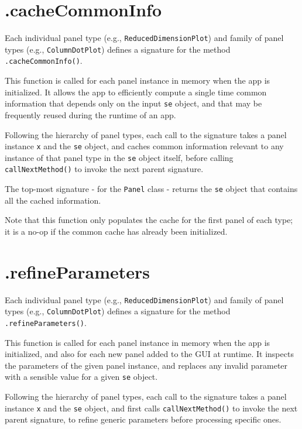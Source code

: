 \documentclass[]{book}
\begin{document}
\section{.cacheCommonInfo}\label{cachecommoninfo}

Each individual panel type (e.g., \texttt{ReducedDimensionPlot}) and
family of panel types (e.g., \texttt{ColumnDotPlot}) defines a signature
for the method \texttt{.cacheCommonInfo()}.

This function is called for each panel instance in memory when the app
is initialized. It allows the app to efficiently compute a single time
common information that depends only on the input \texttt{se} object,
and that may be frequently reused during the runtime of an app.

Following the hierarchy of panel types, each call to the signature takes
a panel instance \texttt{x} and the \texttt{se} object, and caches
common information relevant to any instance of that panel type in the
\texttt{se} object itself, before calling \texttt{callNextMethod()} to
invoke the next parent signature.

The top-most signature - for the \texttt{Panel} class - returns the
\texttt{se} object that contains all the cached information.

Note that this function only populates the cache for the first panel of
each type; it is a no-op if the common cache has already been
initialized.

\section{.refineParameters}\label{refineparameters}

Each individual panel type (e.g., \texttt{ReducedDimensionPlot}) and
family of panel types (e.g., \texttt{ColumnDotPlot}) defines a signature
for the method \texttt{.refineParameters()}.

This function is called for each panel instance in memory when the app
is initialized, and also for each new panel added to the GUI at runtime.
It inspects the parameters of the given panel instance, and replaces any
invalid parameter with a sensible value for a given \texttt{se} object.

Following the hierarchy of panel types, each call to the signature takes
a panel instance \texttt{x} and the \texttt{se} object, and first calls
\texttt{callNextMethod()} to invoke the next parent signature, to refine
generic parameters before processing specific ones.
\end{document}
